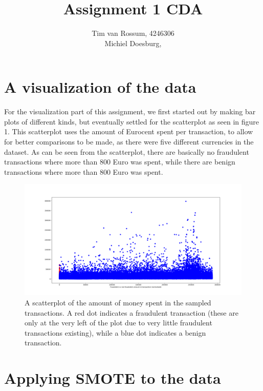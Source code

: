 \documentclass[]{article}
\title{Assignment 1 CDA}
\author{Tim van Rossum, 4246306\\
	Michiel Doesburg,}
\begin{document}
\maketitle

\section{A visualization of the data}
For the visualization part of this assignment, we first started out by making bar plots of different kinds, but eventually settled  for the scatterplot as seen in figure 1. This scatterplot uses the amount of Eurocent spent per transaction, to allow for better comparisons to be made, as there were five different currencies in the dataset. As can be seen from the scatterplot, there are basically no fraudulent transactions where more than 800 Euro was spent, while there are benign transactions where more than 800 Euro was spent.
\begin{figure}[h!]
	\centering
	\includegraphics[scale = 0.25]{Visualizations/fraud_vs_nonfraud_better}
	\caption{A scatterplot of the amount of money spent in the sampled transactions. A red dot indicates a fraudulent transaction (these are only at the very left of the plot due to very little fraudulent transactions existing), while a blue dot indicates a benign transaction.}
\end{figure}
\clearpage
\section{Applying SMOTE to the data}
\end{document}
